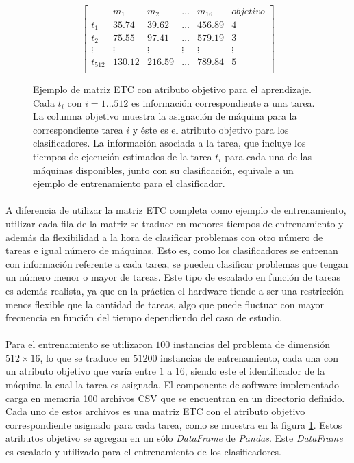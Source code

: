 \begin{figure}[ht!]
\[
\begin{bmatrix}
     & m_1 & m_2 & \dots  & m_{16} & objetivo \\
    t_1 & 35.74 & 39.62 & \dots  & 456.89 & 4 \\
    t_2 & 75.55 & 97.41 & \dots  & 579.19 & 3 \\
    \vdots & \vdots & \vdots & \vdots & \vdots & \vdots\\
    t_{512} & 130.12 & 216.59 & \dots  & 789.84 & 5\\
\end{bmatrix}
\]
\caption{Ejemplo de matriz ETC con atributo objetivo para el aprendizaje.
Cada $t_i$ con $i = 1 \dots 512$ es información correspondiente a una tarea.
La columna objetivo muestra la asignación de máquina para la correspondiente tarea $i$ y éste es el atributo objetivo para los clasificadores.
La información asociada a la tarea, que incluye los tiempos de ejecución estimados de la tarea $t_i$ para cada una de las máquinas disponibles, junto con su clasificación, equivale a un ejemplo de entrenamiento para el clasificador.}
\label{table:datosentrenamiento}
\end{figure}

\paragraph{}A diferencia de utilizar la matriz ETC completa como ejemplo de entrenamiento, utilizar cada fila de la matriz se traduce en menores tiempos de entrenamiento y además da flexibilidad a la hora de clasificar problemas con otro número de tareas e igual número de máquinas.
Esto es, como los clasificadores se entrenan con información referente a cada tarea, se pueden clasificar problemas que tengan un número menor o mayor de tareas.
Este tipo de escalado en función de tareas es además realista, ya que en la práctica el hardware tiende a ser una restricción menos flexible que la cantidad de tareas, algo que puede fluctuar con mayor frecuencia en función del tiempo dependiendo del caso de estudio.

\paragraph{} Para el entrenamiento se utilizaron $100$ instancias del problema de dimensión $512 \times 16$, lo que se traduce en $51200$ instancias de entrenamiento, cada una con un atributo objetivo que varía entre $1$ a $16$, siendo este el identificador de la máquina la cual la tarea es asignada.
El componente de software implementado carga en memoria 100 archivos CSV que se encuentran en un directorio definido.
Cada uno de estos archivos es una matriz ETC con el atributo objetivo correspondiente asignado para cada tarea, como se muestra en la figura \ref{table:datosentrenamiento}.
Estos atributos objetivo se agregan en un sólo \textit{DataFrame}\cite{DataFrame-pandas} de \textit{Pandas}.
Este \textit{DataFrame} es escalado y utilizado para el entrenamiento de los clasificadores.


